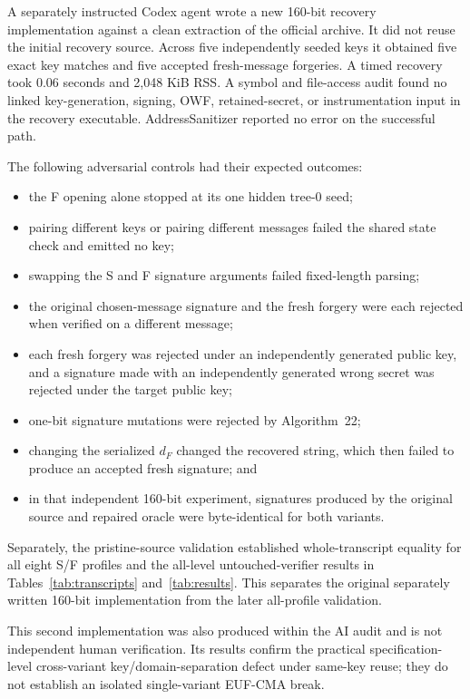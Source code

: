 \documentclass[11pt,a4paper]{article}
\begin{document}
A separately instructed Codex agent wrote a new 160-bit recovery implementation
against a clean extraction of the official archive.  It did not reuse the initial
recovery source.  Across five independently seeded keys it obtained five exact key
matches and five accepted fresh-message forgeries.  A timed recovery took 0.06
seconds and 2,048 KiB RSS.  A symbol and file-access audit found no linked
key-generation, signing, OWF, retained-secret, or instrumentation input in the
recovery executable.  AddressSanitizer reported no error on the successful path.

The following adversarial controls had their expected outcomes:
\begin{itemize}[leftmargin=*,itemsep=2pt]
  \item the F opening alone stopped at its one hidden tree-0 seed;
  \item pairing different keys or pairing different messages failed the shared
        state check and emitted no key;
  \item swapping the S and F signature arguments failed fixed-length parsing;
  \item the original chosen-message signature and the fresh forgery were each
        rejected when verified on a different message;
  \item each fresh forgery was rejected under an independently generated public
        key, and a signature made with an independently generated wrong secret
        was rejected under the target public key;
  \item one-bit signature mutations were rejected by Algorithm~22;
  \item changing the serialized $d_F$ changed the recovered string, which then
        failed to produce an accepted fresh signature; and
  \item in that independent 160-bit experiment, signatures produced by the
        original source and repaired oracle were byte-identical for both variants.
\end{itemize}

Separately, the pristine-source validation established whole-transcript equality
for all eight S/F profiles and the all-level untouched-verifier results in
Tables~\ref{tab:transcripts} and~\ref{tab:results}.  This separates the original
separately written 160-bit implementation from the later all-profile validation.

This second implementation was also produced within the AI audit and is not
independent human verification.  Its results confirm the practical
specification-level cross-variant key/domain-separation defect under same-key
reuse; they do not establish an isolated single-variant EUF-CMA break.
\end{document}
